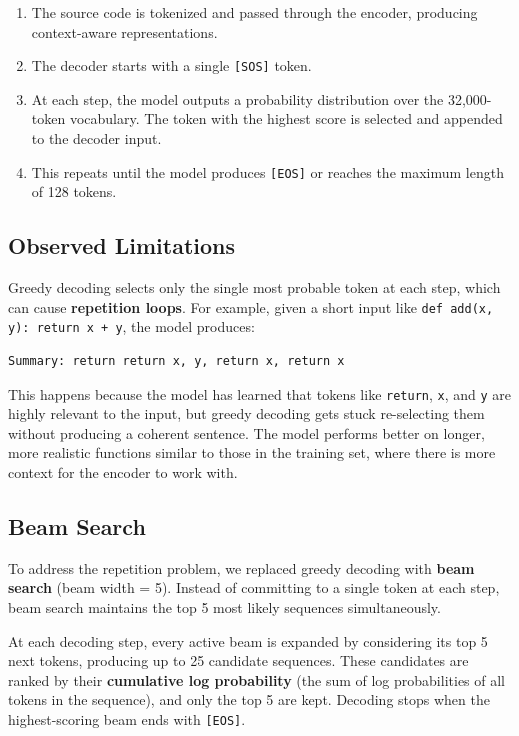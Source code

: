 \documentclass[11pt]{article}
\begin{document}
\begin{enumerate}
\item The source code is tokenized and passed through the encoder, producing context-aware representations.
\item The decoder starts with a single \texttt{[SOS]} token.
\item At each step, the model outputs a probability distribution over the 32,000-token vocabulary. The token with the highest score is selected and appended to the decoder input.
\item This repeats until the model produces \texttt{[EOS]} or reaches the maximum length of 128 tokens.
\end{enumerate}

\subsection{Observed Limitations}

Greedy decoding selects only the single most probable token at each step, which can cause \textbf{repetition loops}. For example, given a short input like \texttt{def add(x, y): return x + y}, the model produces:

\begin{lstlisting}[style=plain]
Summary: return return x, y, return x, return x
\end{lstlisting}

This happens because the model has learned that tokens like \texttt{return}, \texttt{x}, and \texttt{y} are highly relevant to the input, but greedy decoding gets stuck re-selecting them without producing a coherent sentence. The model performs better on longer, more realistic functions similar to those in the training set, where there is more context for the encoder to work with.

\subsection{Beam Search}

To address the repetition problem, we replaced greedy decoding with \textbf{beam search} (beam width = 5). Instead of committing to a single token at each step, beam search maintains the top 5 most likely sequences simultaneously.

At each decoding step, every active beam is expanded by considering its top 5 next tokens, producing up to 25 candidate sequences. These candidates are ranked by their \textbf{cumulative log probability} (the sum of log probabilities of all tokens in the sequence), and only the top 5 are kept. Decoding stops when the highest-scoring beam ends with \texttt{[EOS]}.
\end{document}
